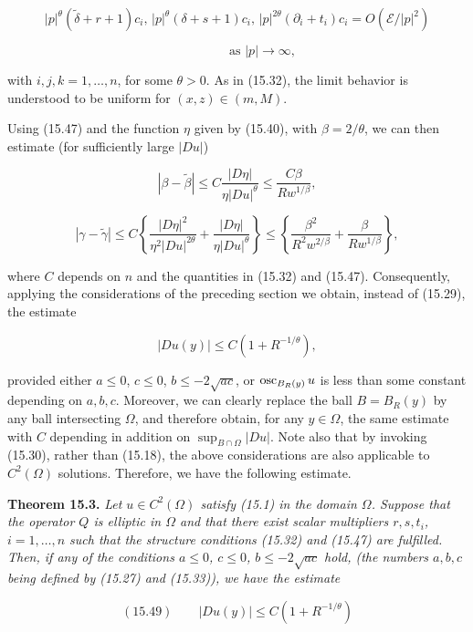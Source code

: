 \[
|p|^{\theta}(\tilde{\delta}+r+1)c_{i},\,|p|^{\theta}(\delta+s+1)c_{i},\,|p|^{2\theta}(\partial_{i}+t_{i})c_{i}=O(\mathscr{E}/|p|^{2})
\]

\[
\qquad\qquad\text{as } |p|\to\infty,
\]

with $i,j,k=1,\ldots,n$, for some $\theta>0$. As in (15.32), the limit behavior is understood
to be uniform for $(x,z)\in(m,M)$.

Using (15.47) and the function $\eta$ given by (15.40), with $\beta=2/\theta$, we can then
estimate (for sufficiently large $|Du|$)

\[
|\beta-\tilde{\beta}|\leq C\frac{|D\eta|}{\eta|Du|^{\theta}}\leq \frac{C\beta}{Rw^{1/\beta}},
\]

\[
|\gamma-\tilde{\gamma}|\leq C\left\{\frac{|D\eta|^{2}}{\eta^{2}|Du|^{2\theta}}+\frac{|D\eta|}{\eta|Du|^{\theta}}\right\}\leq
\left\{\frac{\beta^{2}}{R^{2}w^{2/\beta}}+\frac{\beta}{Rw^{1/\beta}}\right\},
\]

where $C$ depends on $n$ and the quantities in (15.32) and (15.47). Consequently,
applying the considerations of the preceding section we obtain, instead of (15.29),
the estimate

\begin{equation}
\tag{15.48}
|Du(y)|\leq C\left(1+R^{-1/\theta}\right),
\end{equation}

\pagestyle{empty}

provided either $a \leq 0$, $c \leq 0$, $b \leq -2\sqrt{ac}$, or $\operatorname{osc}_{B_R(y)}u$ is less than some constant depending on $a,b,c$. Moreover, we can clearly replace the ball $B = B_R(y)$ by any ball intersecting $\Omega$, and therefore obtain, for any $y \in \Omega$, the same estimate with $C$ depending in addition on $\sup_{B\cap \Omega}|Du|$. Note also that by invoking (15.30), rather than (15.18), the above considerations are also applicable to $C^2(\Omega)$ solutions. Therefore, we have the following estimate.

\textbf{Theorem 15.3.} \textit{Let $u \in C^2(\Omega)$ satisfy (15.1) in the domain $\Omega$. Suppose that the operator $Q$ is elliptic in $\Omega$ and that there exist scalar multipliers $r,s,t_i$, $i=1,\ldots,n$ such that the structure conditions (15.32) and (15.47) are fulfilled. Then, if any of the conditions $a \leq 0$, $c \leq 0$, $b \leq -2\sqrt{ac}$ hold, (the numbers $a,b,c$ being defined by (15.27) and (15.33)), we have the estimate}

\begin{equation}
(15.49)\qquad |Du(y)| \leq C(1 + R^{-1/\theta})
\end{equation}

